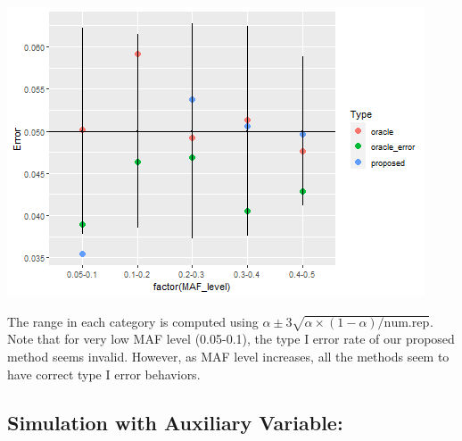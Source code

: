 \documentclass[
]{article}
\newenvironment{Shaded}{\begin{snugshade}}{\end{snugshade}}
\newcommand{\DataTypeTok}[1]{\textcolor[rgb]{0.13,0.29,0.53}{#1}}
\newcommand{\DecValTok}[1]{\textcolor[rgb]{0.00,0.00,0.81}{#1}}
\newcommand{\FloatTok}[1]{\textcolor[rgb]{0.00,0.00,0.81}{#1}}
\newcommand{\KeywordTok}[1]{\textcolor[rgb]{0.13,0.29,0.53}{\textbf{#1}}}
\newcommand{\NormalTok}[1]{#1}
\newcommand{\OperatorTok}[1]{\textcolor[rgb]{0.81,0.36,0.00}{\textbf{#1}}}
\newcommand{\StringTok}[1]{\textcolor[rgb]{0.31,0.60,0.02}{#1}}
\begin{document}
\begin{Shaded}
\begin{Highlighting}[]
{{{\NormalTok{all_error }\OperatorTok{%
\end{Highlighting}
\end{Shaded}

\includegraphics{stats-gene-research-progress-v8_files/figure-latex/unnamed-chunk-5-1.png}

The range in each category is computed using
\(\alpha \pm 3\sqrt{\alpha\times(1-\alpha)/\text{num.rep}}\). Note that
for very low MAF level (0.05-0.1), the type I error rate of our proposed
method seems invalid. However, as MAF level increases, all the methods
seem to have correct type I error behaviors.

\clearpage

\hypertarget{simulation-with-auxiliary-variable}{%
\subsection{Simulation with Auxiliary
Variable:}\label{simulation-with-auxiliary-variable}}
\end{document}
